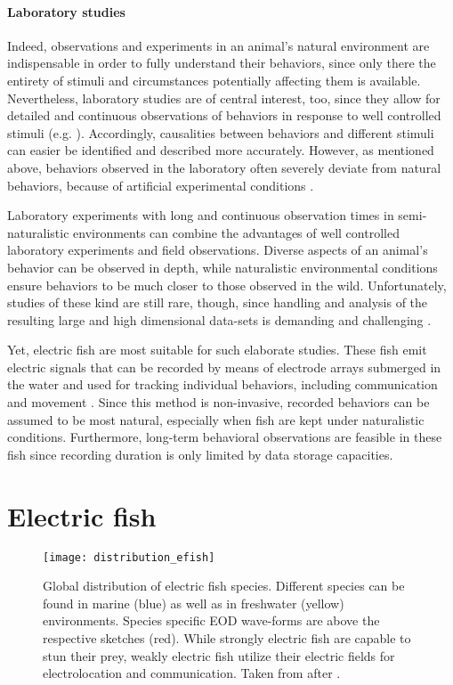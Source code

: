 \paragraph{Laboratory studies} 
Indeed, observations and experiments in an animal's natural environment are indispensable in order to fully understand their behaviors, since only there the entirety of stimuli and circumstances potentially affecting them is available. Nevertheless, laboratory studies are of central interest, too, since they allow for detailed and continuous observations of behaviors in response to well controlled stimuli (e.g. \citealp{Chivers1995, Barber2000, Hupe2008}). Accordingly, causalities between behaviors and different stimuli can easier be identified and described more accurately. However, as mentioned above, behaviors observed in the laboratory often severely deviate from natural behaviors, because of artificial experimental conditions \citep{Henninger2018}. 

Laboratory experiments with long and continuous observation times in semi-naturalistic environments can combine the advantages of well controlled laboratory experiments and field observations. Diverse aspects of an animal's behavior can be observed in depth, while naturalistic environmental conditions ensure behaviors to be much closer to those observed in the wild. Unfortunately, studies of these kind are still rare, though, since handling and analysis of the resulting large and high dimensional data-sets is demanding and challenging \citep{Gomez2014}.

Yet, electric fish are most suitable for such elaborate studies. These fish emit electric signals that can be recorded by means of electrode arrays submerged in the water and used for tracking individual behaviors, including communication \citep{Smith2013} and movement \citep{Madhav2018, Henninger2020}. Since this method is non-invasive, recorded behaviors can be assumed to be most natural, especially when fish are kept under naturalistic conditions. Furthermore, long-term behavioral observations are feasible in these fish since recording duration is only limited by data storage capacities.

\section{Electric fish}

\begin{figure}[h!]
  \centerline{\texttt{[image: distribution\_efish]}}
  \caption{\label{efish_dist} Global distribution of electric fish species. Different species can be found in marine (blue) as well as in freshwater (yellow) environments. Species specific EOD wave-forms are above the respective sketches (red). While strongly electric fish are capable to stun their prey, weakly electric fish utilize their electric fields for electrolocation and communication. Taken from \citet{Nelson2011} after \citet{Moller1995}.}
\end{figure}

